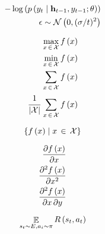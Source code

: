 \documentclass[a4paper,11pt]{article}
\DeclareMathOperator{\expect}{\mathop{\mathbb{E}}}
\begin{document}
\begin{align*}
	-\apply{\log}{\pc{y_{t}}{\ve{h}_{t-1},y_{t-1};\theta}} \\
	\epsilon \obey \normdist{0}{(\sigma/t)^{2}}
\end{align*}

\begin{align*}
	\maxset{f}{x}{\mathcal{X}} \\
	\minset{f}{x}{\mathcal{X}} \\
	\sumset{f}{x}{\mathcal{X}} \\
	\meanset{f}{x}{\mathcal{X}} \\
\end{align*}

\begin{equation*}
	\mapset{f}{x}{\mathcal{X}}
\end{equation*}

\begin{align*}
	\pd{\apply{f}{x}}{x} \\
	\pdn{\apply{f}{x}}{x}{2} \\
	\pds{\apply{f}{x}}{x}{y} \\
\end{align*}

\begin{equation}
	\expect_{s_{t}\obey E,a_i\obey \pi}{ \apply{R}{s_{t},a_{t}}}
\end{equation}
	
\end{document}
